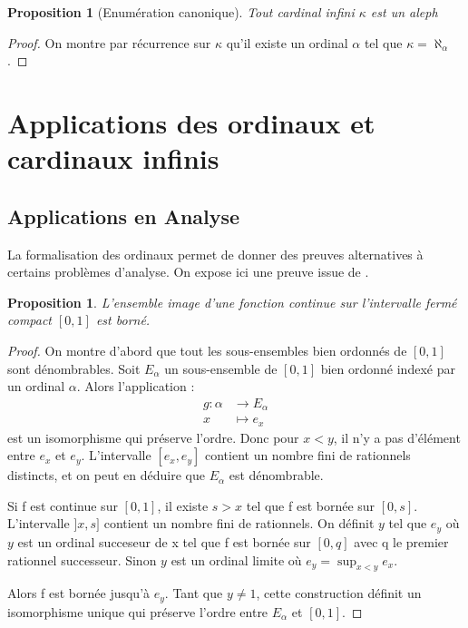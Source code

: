 \documentclass{article}
\theoremstyle{definition}
\theoremstyle{plain}
\newtheorem{proposition}[subsubsection]{Proposition}
\theoremstyle{plain}
\theoremstyle{plain}
\theoremstyle{plain}
\theoremstyle{plain}
\begin{document}
\begin{proposition}[Enumération canonique]
	Tout cardinal infini \( \kappa \) est un aleph
\end{proposition}

\begin{proof}
	On montre par récurrence sur \( \kappa \) qu'il existe un ordinal \( \alpha \) tel que \( \kappa = \aleph_{\alpha} \).
\end{proof}
\clearpage

\section{Applications des ordinaux et cardinaux infinis}
\subsection{Applications en Analyse}

\par La formalisation des ordinaux permet de donner des preuves alternatives à certains problèmes d'analyse. On expose ici une preuve issue de \cite{gowers2010ordinals}.

\begin{proposition}
	L'ensemble image d'une fonction continue sur l'intervalle fermé compact \( [0,1] \) est borné.
\end{proposition}

\begin{proof}
	On montre d'abord que tout les sous-ensembles bien ordonnés de \( [0,1] \) sont dénombrables. Soit \( E_{\alpha} \) un sous-ensemble de \( [0,1] \) bien ordonné indexé par un ordinal \( \alpha \). Alors l'application :
\begin{align*}	
	g : \alpha &\rightarrow E_{\alpha} \\
	x &\mapsto e_{x}
\end{align*}
est un isomorphisme qui préserve l'ordre. Donc pour \( x < y \), il n'y a pas d'élément entre \( e_{x} \) et \( e_{y} \). L'intervalle \( [e_{x},e_{y}] \) contient un nombre fini de rationnels distincts, et on peut en déduire que \( E_{\alpha} \) est dénombrable.

Si f est continue sur \( [0,1] \), il existe \( s > x \) tel que f est bornée sur \( [0,s] \). L'intervalle \( ]x,s] \) contient un nombre fini de rationnels. On définit \( y \) tel que \( e_{y} \) où \( y \) est un ordinal succeseur de x tel que f est bornée sur \( [0,q] \) avec q le premier rationnel successeur. Sinon \( y \) est un ordinal limite où \( e_y = \sup_{x<y} e_{x} \). 

Alors f est bornée jusqu'à \( e_{y} \). Tant que \( y \neq 1 \), cette construction définit un isomorphisme unique qui préserve l'ordre entre \( E_{\alpha} \) et \( [0,1] \).
\end{proof}
\end{document}
